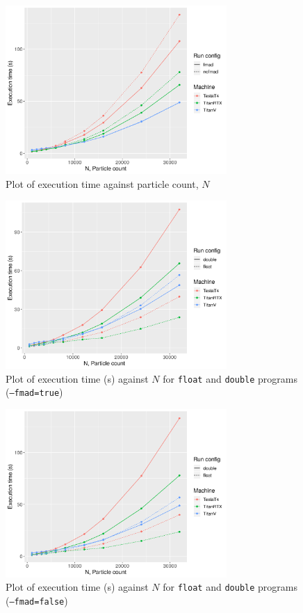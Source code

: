 \documentclass[12pt]{article}
\begin{document}
\begin{figure}[H]
    \centering
    \includegraphics[width=0.75\textwidth]{gpu-varyN}
    \caption{Plot of execution time against particle count, $N$}
    \label{fig:gpu-varyN}
\end{figure}

\begin{figure}[H]
    \centering
    \includegraphics[width=0.75\textwidth]{double-float-comparison-fmad}
    \caption{Plot of execution time (s) against $N$ for \texttt{float} and \texttt{double} programs (\texttt{--fmad=true})}
    \label{fig:double-float-comparison-fmad}
\end{figure}

\begin{figure}[H]
    \centering
    \includegraphics[width=0.75\textwidth]{double-float-comparison-nofmad}
    \caption{Plot of execution time (s) against $N$ for \texttt{float} and \texttt{double} programs (\texttt{--fmad=false})}
    \label{fig:double-float-comparison-nofmad}
\end{figure}
\end{document}
